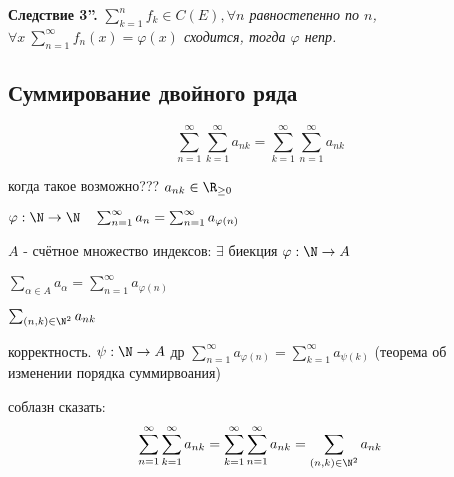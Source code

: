   {\noindent \textbf{Следствие 3''.}}
  \textit{
    $\sum^n_{k=1}f_k \in C(E), \forall n$ равностепенно по $n$, $\forall x \ \sum^\infty_{n=1} f_n(x) = \varphi(x)$ сходится, тогда $\varphi$ непр.
  }

  \subsection*{Суммирование двойного ряда}

  $$\sum^\infty_{n=1}\sum^\infty_{k=1}a_{nk} = \sum^\infty_{k=1}\sum^\infty_{n=1}a_{nk}$$

  когда такое возможно???
  $a_{nk} \in \R_{\ge 0}$ 

  $\varphi:\N \to \N \quad \sum^\infty_{n=1} a_n = \sum^\infty_{n=1}a_{\varphi(n)}$

  \begin{definition}
    
    $A$ - счётное множество индексов: $\exists$ биекция $\varphi: \N \to A$
  
    $\sum_{\alpha \in A} a_\alpha = \sum^\infty_{n=1}a_{\varphi(n)}$
  
    $\sum_{(n,k) \in \N^2}a_{nk}$
  
    корректность. $\psi: \N \to A$ др $\sum^\infty_{n=1} a_{\varphi(n)} = \sum^\infty_{k=1}a_{\psi(k)}$ (теорема об изменении порядка суммирвоания)
  \end{definition}
  соблазн сказать:
  $$\sum^\infty_{n=1}\sum^\infty_{k=1}a_{nk} = \sum^\infty_{k=1}\sum^\infty_{n=1}a_{nk} = \sum_{(n,k)\in \N^2} a_{nk}$$

